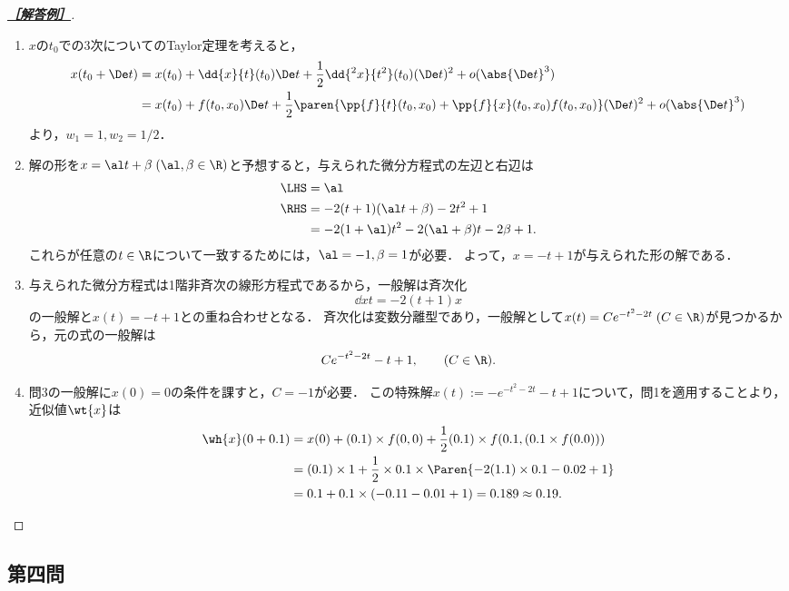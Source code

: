 \documentclass[uplatex,dvipdfmx]{jsarticle}
\begin{document}
\begin{proof}[\textbf{\underline{［解答例］}}]\mbox{}
    \begin{enumerate}
        \item $x$の$t_0$での3次についてのTaylor定理を考えると，
        \begin{align*}
            x(t_0+\De t)&=x(t_0)+\dd{x}{t}(t_0)\De t+\frac{1}{2}\dd{^2x}{t^2}(t_0)(\De t)^2+o(\abs{\De t}^3)\\
            &=x(t_0)+f(t_0,x_0)\De t+\frac{1}{2}\paren{\pp{f}{t}(t_0,x_0)+\pp{f}{x}(t_0,x_0)f(t_0,x_0)}(\De t)^2+o(\abs{\De t}^3)
        \end{align*}
        より，$w_1=1,w_2=1/2$．
        \item 解の形を$x=\al t+\beta\;(\al,\beta\in\R)$と予想すると，与えられた微分方程式の左辺と右辺は
        \begin{align*}
            \LHS&=\al\\
            \RHS&=-2(t+1)(\al t+\beta)-2t^2+1\\
            &=-2(1+\al)t^2-2(\al+\beta)t-2\beta+1.
        \end{align*}
        これらが任意の$t\in\R$について一致するためには，$\al=-1,\beta=1$が必要．
        よって，$x=-t+1$が与えられた形の解である．
        \item 与えられた微分方程式は1階非斉次の線形方程式であるから，一般解は斉次化
        \[\dd{x}{t}=-2(t+1)x\]
        の一般解と$x(t)=-t+1$との重ね合わせとなる．
        斉次化は変数分離型であり，一般解として$x(t)=Ce^{-t^2-2t}\;(C\in\R)$が見つかるから，元の式の一般解は
        \[Ce^{-t^2-2t}-t+1,\qquad(C\in\R).\]
        \item 問3の一般解に$x(0)=0$の条件を課すと，$C=-1$が必要．
        この特殊解$x(t):=-e^{-t^2-2t}-t+1$について，問1を適用することより，近似値$\wt{x}$は
        \begin{align*}
            \wh{x}(0+0.1)&=x(0)+(0.1)\times f(0,0)+\frac{1}{2}(0.1)\times f(0.1,(0.1\times f(0.0)))\\
            &=(0.1)\times 1+\frac{1}{2}\times 0.1\times\Paren{-2(1.1)\times0.1-0.02+1}\\
            &=0.1+0.1\times(-0.11-0.01+1)=0.189\approx0.19.
        \end{align*}
    \end{enumerate}
\end{proof}

\subsection{第四問}
\end{document}
